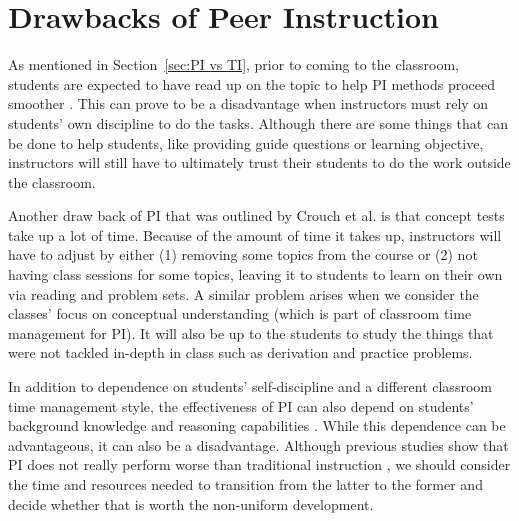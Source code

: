 \section{Drawbacks of Peer Instruction}
As mentioned in Section~\ref{sec:PI vs TI}, prior to coming to the classroom, students are expected to have read up on the topic to help PI methods proceed smoother \cite{mazur1999,crouch2001peer}.
This can prove to be a disadvantage when instructors must rely on students' own discipline to do the tasks.
Although there are some things that can be done to help students, like providing guide questions or learning objective, instructors will still have to ultimately trust their students to do the work outside the classroom. 

Another draw back of PI that was outlined by Crouch et al. \cite{crouch2001peer} is that concept tests take up a lot of time.
Because of the amount of time it takes up, instructors will have to adjust by either (1) removing some topics from the course or (2) not having class sessions for some topics, leaving it to students to learn on their own via reading and problem sets.
A similar problem arises when we consider the classes' focus on conceptual understanding (which is part of classroom time management for PI).
It will also be up to the students to study the things that were not tackled in-depth in class such as derivation and practice problems.

In addition to dependence on students' self-discipline and a different classroom time management style, the effectiveness of PI can also depend on students' background knowledge and reasoning capabilities \cite{lasry2008peer}.
While this dependence can be advantageous, it can also be a disadvantage.
Although previous studies show that PI does not really perform worse than traditional instruction \cite{crouch2001peer,lasry2008peer}, we should consider the time and resources needed to transition from the latter to the former and decide whether that is worth the non-uniform development.


